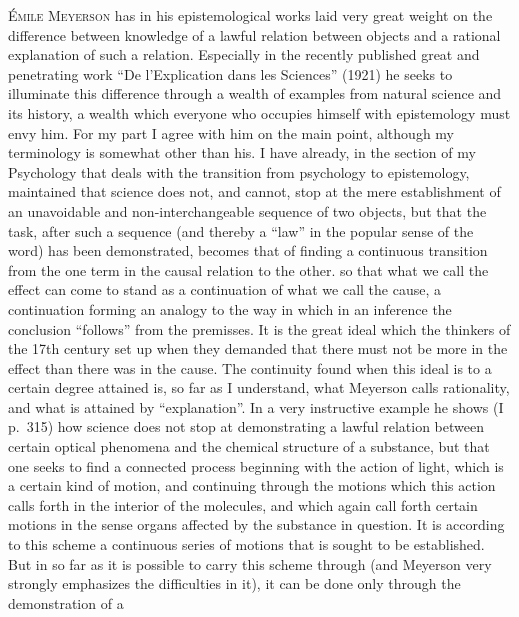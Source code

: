 \documentclass[12pt]{article}
\newcommand{\opage}[1]{\marginnote{\footnotesize\textit{[#1]}}}
\begin{document}
\textsc{Émile Meyerson} has in his epistemological works laid very great
weight on the difference between knowledge of \opage{53}a lawful relation between
objects and a rational explanation of such a relation. Especially in the
recently published great and penetrating work ``De l'Explication dans les
Sciences'' (1921) he seeks to illuminate this difference through a wealth of
examples from natural science and its history, a wealth which everyone who
occupies himself with epistemology must envy him. For my part I agree with
him on the main point, although my terminology is somewhat other than his. I
have already, in the section of my Psychology that deals with the transition
from psychology to epistemology, maintained that science does not, and
cannot, stop at the mere establishment of an unavoidable and
non-interchangeable sequence of two objects, but that the task, after such a
sequence (and thereby a ``law'' in the popular sense of the word) has been
demonstrated, becomes that of finding a continuous transition from the one
term in the causal relation to the other. so that what we call the effect
can come to stand as a continuation of what we call the cause, a
continuation forming an analogy to the way in which in an inference the
conclusion ``follows'' from the premisses.
It is the great ideal which the thinkers of the 17th century set up when
they demanded that there must not be more in the effect than there was in
the cause. The continuity found when this ideal is to a certain degree
attained is, so far as I understand, what Meyerson calls rationality, and
what is attained by ``explanation''. In a very instructive example he shows
(I p.~315) how science does not stop at demonstrating a lawful relation
between certain optical phenomena and the chemical structure of a substance,
but that one seeks to find a connected process beginning with the action of
light, which is a certain kind of motion, \opage{54}and continuing through the motions
which this action calls forth in the interior of the molecules, and which
again call forth certain motions in the sense organs affected by the
substance in question. It is according to this scheme a continuous series of
motions that is sought to be established. But in so far as it is possible to
carry this scheme through (and Meyerson very strongly emphasizes the
difficulties in it), it can be done only through the demonstration of a
\end{document}
